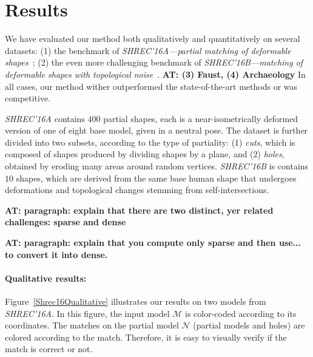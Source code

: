 \documentclass[10pt,twocolumn,letterpaper]{article}
\newcommand{\colornote}[3]{{\color{#1}\bf{#2: #3}\normalfont}}
\newcommand{\colornote}[3]{}
\newcommand {\ayellet}[1]{\colornote{blue}{AT}{#1}}
\begin{document}
\section{Results}
\label{section:results}

We have evaluated our method both qualitatively and quantitatively on several datasets:
(1) the benchmark of {\em SHREC'16A---partial matching of deformable shapes}~\cite{cosmo2016shrec};
(2) the even more challenging benchmark of {\em SHREC’16B---matching of deformable shapes with topological noise}~\cite{lahner2016shrec}.
\ayellet{(3) Faust, (4) Archaeology}
In all cases, our method wither outperformed the state-of-the-art methods or was competitive.

{\em SHREC'16A} contains $400$ partial shapes, each is a near-isometrically deformed version of one of eight base model, given in a neutral pose.
The dataset is further divided into two subsets, according to the type of partiality:
(1) \textit{cuts}, which is composed of shapes produced by dividing shapes by a plane, and (2) \textit{holes}, obtained by eroding many areas around random vertices. 
{\em SHREC’16B} is contains $10$ shapes, which are
derived from the same base human shape that undergoes deformations and topological changes stemming from self-intersections. 

\ayellet{paragraph: explain that there are two distinct, yer related challenges: sparse and dense}

\ayellet{paragraph: explain that you compute only sparse and then use... to convert it into dense.}
 
\paragraph{Qualitative results:} 
Figure~\ref{Shrec16Qualitative} illustrates our results on two models from {\em SHREC'16A}.
In this figure, the input model $\mathcal{M}$ is color-coded according to its coordinates.
The matches on the partial model $\mathcal{N}$ (partial models and holes) are colored according to the match.
Therefore, it is easy to visually verify if the match is correct or not.
\end{document}
